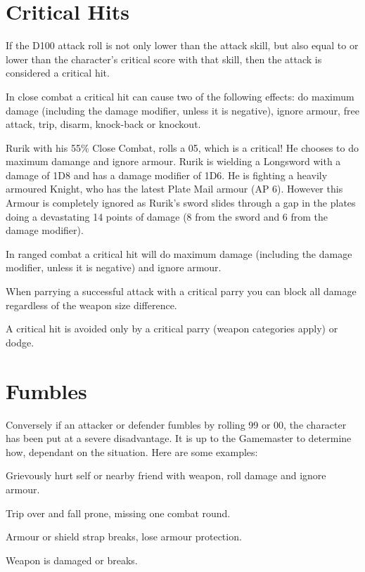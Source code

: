 \section{Critical Hits}

If the D100 attack roll is not only lower than the attack skill, but also equal to or lower than the character’s critical score with that skill, then the attack is considered a critical hit. 

In close combat a critical hit can cause two of the following effects: do maximum damage (including the damage modifier, unless it is negative), ignore armour, free attack, trip, disarm, knock-back or knockout.

\begin{rpg-examplebox}
 Rurik with his 55\% Close Combat, rolls a 05, which is a critical! He chooses to do maximum damange and ignore armour. Rurik is wielding a Longsword with a damage of 1D8 and has a damage modifier of 1D6. He is fighting a heavily armoured Knight, who has the latest Plate Mail armour (AP 6). However this Armour is completely ignored as Rurik’s sword slides through a gap in the plates doing a devastating 14 points of damage (8 from the sword and 6 from the damage modifier).
\end{rpg-examplebox}

In ranged combat a critical hit will do maximum damage (including the damage modifier, unless it is negative) and ignore armour.

When parrying a successful attack with a critical parry you can block all damage regardless of the weapon size difference.

A critical hit is avoided only by a critical parry (weapon categories apply) or dodge.



\section{Fumbles}
Conversely if an attacker or defender fumbles by rolling 99 or 00, the character has been put at a severe disadvantage. It is up to the Gamemaster to determine how, dependant on the situation. Here are some examples:
\begin{rpg-list}
	\item Grievously hurt self or nearby friend with weapon, roll damage and ignore armour.
	\item Trip over and fall prone, missing one combat round.
	\item Armour or shield strap breaks, lose armour protection.
	\item Weapon is damaged or breaks.
\end{rpg-list}



